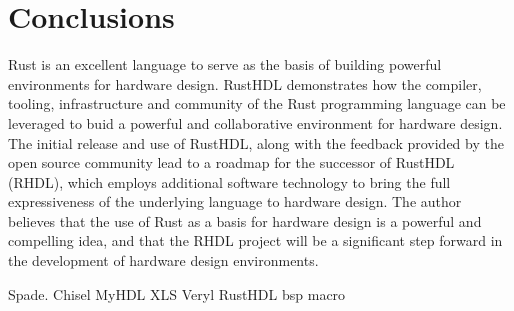\documentclass[conference]{IEEEtran}
\begin{document}
\section{Conclusions}\label{sec:conclusions}

Rust is an excellent language to serve as the basis of building powerful environments for 
hardware design.  RustHDL demonstrates how the compiler, tooling, infrastructure and 
community of the Rust programming language can be leveraged to buid a powerful and 
collaborative environment for hardware design.  The initial release and use of RustHDL,
along with the feedback provided by the open source community lead to a roadmap for 
the successor of RustHDL (RHDL), which employs additional software technology to bring
the full expressiveness of the underlying language to hardware design.  The author believes
that the use of Rust as a basis for hardware design is a powerful and compelling idea, and
that the RHDL project will be a significant step forward in the development of hardware
design environments.

\begin{thebibliography}{00}
 Spade.
 Chisel
 MyHDL
 XLS
 Veryl
 RustHDL
 bsp
 macro
\end{thebibliography}
\vspace{12pt}
\end{document}
